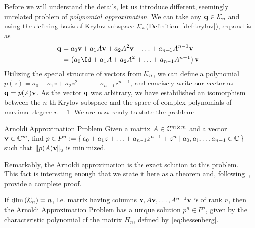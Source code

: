 Before we will understand the details, let us introduce different, seemingly unrelated problem of 
\textit{polynomial approximation}. We can take any \(\vectorbold{q} \in \K{n}\) and using the 
defining basis of Krylov subspace \(\mathcal{K}_{n}\)(Definition~\ref{def:krylov}), expand is as
\begin{align*}
	\vectorbold{q} &= a_0 \vectorbold{v} + a_1 A \vectorbold{v} + a_2 A^2 \vectorbold{v} + \ldots + a_{n-1} A^{n-1} \vectorbold{v} \nonumber \\
				   &= \left(a_0\Id + a_1 A + a_2 A^2 + \ldots + a_{n-1} A^{n-1}\right) \vectorbold{v}
\end{align*}
Utilizing the special structure of vectors from \(\mathcal{K}_{n}\), we can define a polynomial \(p(z) = a_0
+ a_1 z + a_2 z^2 + \ldots + a_{n-1}z^{n-1}\), and concisely write our vector as \(\vectorbold{q} = p(A)\vectorbold{v}\).
As the vector \(\vectorbold{q}\) was arbitrary, we have estabilished an isomorphism between the \(n\)-th Krylov
subspace and the space of complex polynomials of maximal degree \(n-1\). We are now ready to state the problem:
\vspace{-0.3cm}
\begin{titled-frame}{Arnoldi Approximation Problem}
	\centering
Given a matrix \(A\in\mathbb{C}^{m\cross m}\) and a vector \(\vectorbold{v}\in \CC^m\), find  
	\( p \in P^n := \{\, a_0 + a_1 z + \ldots + a_{n-1} z^{n-1} + z^n \mid a_0,a_1,\ldots a_{n-1}\in \mathbb{C} \,\} \)\\
	such that \(\norm{p(A)\vectorbold{v}}_2\) is minimized.
\end{titled-frame}

Remarkably, the Arnoldi approximation is the exact solution to this problem. This fact is interesting enough that
we state it here as a theorem and, following~\textcite{Trefethen1997}, provide a complete proof.

\begin{theorem}
	If \(\textrm{dim}\left(\mathcal{K}_{n}\right) = n\), i.e. matrix having columns \(\vectorbold{v},A\vectorbold{v},\ldots, A^{n-1}
	\vectorbold{v}\) is of rank \(n\), then the Arnoldi Approximation Problem has a unique solution \(p^n\in P^n\),
	given by the characteristic polynomial of the matrix \(H_n\), defined by~\eqref{eq:hessenberg}.
	\label{theorem:arnoldi_approximation}
\end{theorem}

